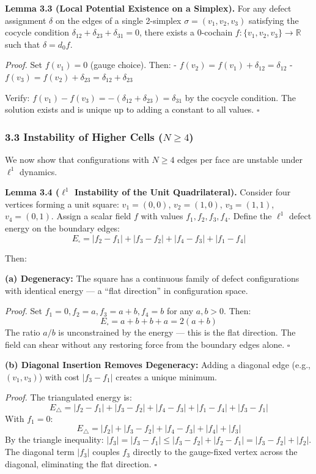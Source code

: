 \documentclass[
]{article}
\begin{document}
\textbf{Lemma 3.3 (Local Potential Existence on a Simplex).} For any
defect assignment \(\delta\) on the edges of a single 2-simplex
\(\sigma = (v_1, v_2, v_3)\) satisfying the cocycle condition
\(\delta_{12} + \delta_{23} + \delta_{31} = 0\), there exists a
0-cochain \(f: \{v_1, v_2, v_3\} \to \mathbb{R}\) such that
\(\delta = d_0 f\).

\emph{Proof.} Set \(f(v_1) = 0\) (gauge choice). Then: -
\(f(v_2) = f(v_1) + \delta_{12} = \delta_{12}\) -
\(f(v_3) = f(v_2) + \delta_{23} = \delta_{12} + \delta_{23}\)

Verify: \(f(v_1) - f(v_3) = -(\delta_{12} + \delta_{23}) = \delta_{31}\)
by the cocycle condition. The solution exists and is unique up to adding
a constant to all values. \(\square\)

\subsubsection{\texorpdfstring{3.3 Instability of Higher Cells
(\(N \geq 4\))}{3.3 Instability of Higher Cells (N \textbackslash geq 4)}}\label{instability-of-higher-cells-n-geq-4}

We now show that configurations with \(N \geq 4\) edges per face are
unstable under \(\ell^1\) dynamics.

\textbf{Lemma 3.4 (\(\ell^1\) Instability of the Unit Quadrilateral).}
Consider four vertices forming a unit square: \(v_1 = (0,0)\),
\(v_2 = (1,0)\), \(v_3 = (1,1)\), \(v_4 = (0,1)\). Assign a scalar field
\(f\) with values \(f_1, f_2, f_3, f_4\). Define the \(\ell^1\) defect
energy on the boundary edges:
\[E_{\square} = |f_2 - f_1| + |f_3 - f_2| + |f_4 - f_3| + |f_1 - f_4|\]

Then:

\textbf{(a) Degeneracy:} The square has a continuous family of defect
configurations with identical energy --- a ``flat direction'' in
configuration space.

\emph{Proof.} Set \(f_1 = 0, f_2 = a, f_3 = a + b, f_4 = b\) for any
\(a, b > 0\). Then: \[E_{\square} = a + b + b + a = 2(a + b)\] The ratio
\(a/b\) is unconstrained by the energy --- this is the flat direction.
The field can shear without any restoring force from the boundary edges
alone. \(\square\)

\textbf{(b) Diagonal Insertion Removes Degeneracy:} Adding a diagonal
edge (e.g., \((v_1, v_3)\)) with cost \(|f_3 - f_1|\) creates a unique
minimum.

\emph{Proof.} The triangulated energy is:
\[E_{\triangle} = |f_2 - f_1| + |f_3 - f_2| + |f_4 - f_3| + |f_1 - f_4| + |f_3 - f_1|\]
With \(f_1 = 0\):
\[E_{\triangle} = |f_2| + |f_3 - f_2| + |f_4 - f_3| + |f_4| + |f_3|\] By
the triangle inequality:
\(|f_3| = |f_3 - f_1| \leq |f_3 - f_2| + |f_2 - f_1| = |f_3 - f_2| + |f_2|\).
The diagonal term \(|f_3|\) couples \(f_3\) directly to the gauge-fixed
vertex across the diagonal, eliminating the flat direction. \(\square\)
\end{document}

